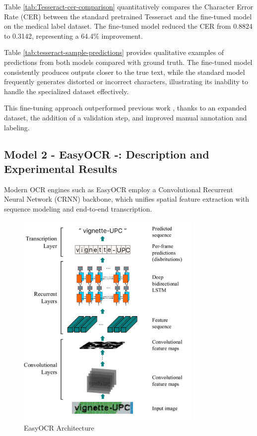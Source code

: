 Table \ref{tab:Tesseract-cer-comparison} quantitatively compares the Character Error Rate (CER) between the standard pretrained Tesseract and the fine-tuned model on the medical label dataset. The fine-tuned model reduced the CER from 0.8824 to 0.3142, representing a 64.4\% improvement.

Table \ref{tab:tesseract-sample-predictions} provides qualitative examples of predictions from both models compared with ground truth. The fine-tuned model consistently produces outputs closer to the true text, while the standard model frequently generates distorted or incorrect characters, illustrating its inability to handle the specialized dataset effectively.

This fine-tuning approach outperformed previous work \cite{ait2024automated}, thanks to an expanded dataset, the addition of a validation step, and improved manual annotation and labeling.


\subsection{Model 2 - EasyOCR -: Description and Experimental Results}

Modern OCR engines such as EasyOCR employ a Convolutional Recurrent Neural Network (CRNN) backbone, which unifies spatial feature extraction with sequence modeling and end‐to‐end transcription. 


\begin{figure}[H]
    \centering
    \includegraphics[width=0.8\textwidth]{Figures/Chapter 3/EasyOCR_Architecture.png}
    \caption{EasyOCR Architecture}
    \label{fig:EasyOCRArchitecture}
\end{figure}



